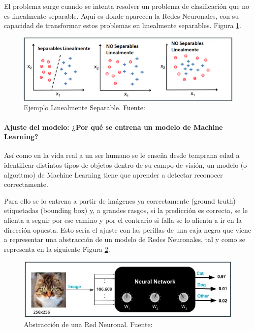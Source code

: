 \newpage
El problema surge cuando se intenta resolver un problema de clasificación que no es linealmente separable. Aquí es donde aparecen la Redes Neuronales, con su capacidad de transformar estos problemas en linealmente separables. Figura \ref{fig:linealmente separables}.

\begin{figure}[h!]
    \centering
    \includegraphics[width=1\textwidth]{img/linealmenteSeparable.png}
    \caption{Ejemplo Linealmente Separable. Fuente: \cite{aprendisajesup}}
    \label{fig:linealmente separables}
\end{figure}

\newpage
\paragraph{Ajuste del modelo: ¿Por qué se entrena un modelo de Machine Learning?}

Así como en la vida real a un ser humano se le enseña desde temprana edad a identificar distintos tipos de objetos dentro de su campo de visión, un modelo (o algoritmo) de Machine Learning tiene que aprender a detectar reconocer correctamente.

Para ello se lo entrena a partir de imágenes ya correctamente (ground truth) etiquetadas (bounding box) y, a grandes rasgos, si la predicción es correcta, se le alienta a seguir por ese camino y por el contrario si falla se lo alienta a ir en la dirección opuesta. Esto sería el ajuste con las perillas de una caja negra que viene a representar una abstracción de un modelo de Redes Neuronales, tal y como se representa en la siguiente Figura \ref{fig:abstraccion red neuronal}.

\begin{figure}[h]
    \centering
    \includegraphics[width=1\textwidth]{img/RedNeuronal.png}
    \caption{Abstracción de una Red Neuronal. Fuente: \cite{redneuronalbasic}}
    \label{fig:abstraccion red neuronal}
\end{figure}

